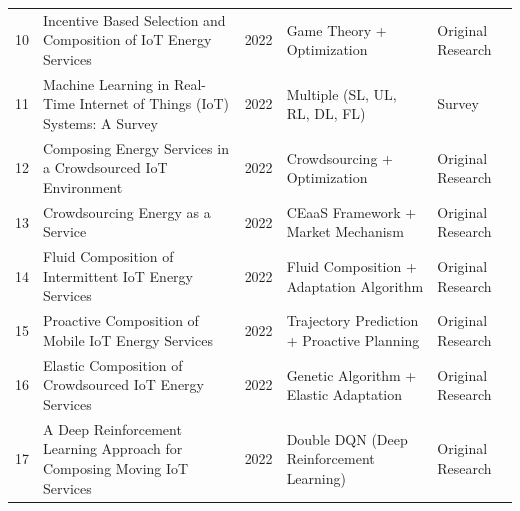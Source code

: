 \documentclass[12pt]{article}
\begin{document}
\begin{longtable}{|p{0.5cm}|p{4.5cm}|p{1cm}|p{3cm}|p{2cm}|}
	10          & Incentive Based Selection and Composition of IoT Energy Services                                                                                      & 2022          & Game Theory + Optimization                                       & Original Research   \\
	11          & Machine Learning in Real-Time Internet of Things (IoT) Systems: A Survey                                                                              & 2022          & Multiple (SL, UL, RL, DL, FL)                                    & Survey              \\
	12          & Composing Energy Services in a Crowdsourced IoT Environment                                                                                           & 2022          & Crowdsourcing + Optimization                                     & Original Research   \\
	13          & Crowdsourcing Energy as a Service                                                                                                                     & 2022          & CEaaS Framework + Market Mechanism                               & Original Research   \\
	14          & Fluid Composition of Intermittent IoT Energy Services                                                                                                 & 2022          & Fluid Composition + Adaptation Algorithm                         & Original Research   \\
	15          & Proactive Composition of Mobile IoT Energy Services                                                                                                   & 2022          & Trajectory Prediction + Proactive Planning                       & Original Research   \\
	16          & Elastic Composition of Crowdsourced IoT Energy Services                                                                                               & 2022          & Genetic Algorithm + Elastic Adaptation                           & Original Research   \\
	17          & A Deep Reinforcement Learning Approach for Composing Moving IoT Services                                                                              & 2022          & Double DQN (Deep Reinforcement Learning)                         & Original Research   \\
\end{longtable}
\end{document}
